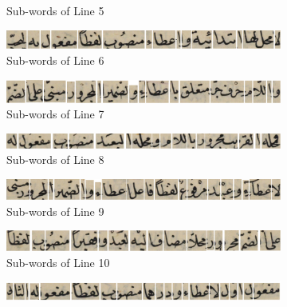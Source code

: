 \begin{figure}[H]
\begin{subfigure}[b]{0.3\textwidth}
         \caption{Sub-words of Line 5}
     \end{subfigure}
     \centering%
     \begin{subfigure}[b]{0.3\textwidth}
         \centering
         \includegraphics[width=\textwidth]{images/word-seg/line-6.png}
         \caption{Sub-words of Line 6}
     \end{subfigure}
     \centering%
     \begin{subfigure}[b]{0.3\textwidth}
         \centering
         \includegraphics[width=\textwidth]{images/word-seg/line-7.png}
         \caption{Sub-words of Line 7}
     \end{subfigure}
     \centering%
     \begin{subfigure}[b]{0.3\textwidth}
         \centering
         \includegraphics[width=\textwidth]{images/word-seg/line-8.png}
         \caption{Sub-words of Line 8}
     \end{subfigure}
     \centering%
     \begin{subfigure}[b]{0.3\textwidth}
         \centering
         \includegraphics[width=\textwidth]{images/word-seg/line-9.png}
         \caption{Sub-words of Line 9}
     \end{subfigure}
     \centering%
     \begin{subfigure}[b]{0.3\textwidth}
         \centering
         \includegraphics[width=\textwidth]{images/word-seg/line-10.png}
         \caption{Sub-words of Line 10}
     \end{subfigure}
     \centering%
     \begin{subfigure}[b]{0.3\textwidth}
         \centering
         \includegraphics[width=\textwidth]{images/word-seg/line-11.png}

\end{subfigure}
\end{figure}
